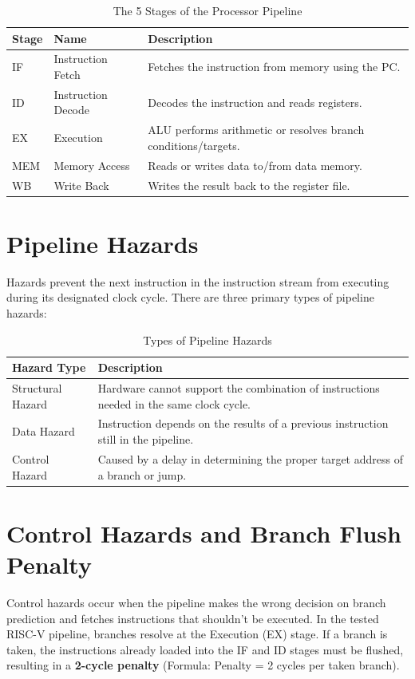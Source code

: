 \begin{table}[h]
\caption{The 5 Stages of the Processor Pipeline}
\centering
\begin{tabular}{|l|l|p{8cm}|}
\hline
\textbf{Stage} & \textbf{Name} & \textbf{Description} \\
\hline
IF & Instruction Fetch & Fetches the instruction from memory using the PC. \\
ID & Instruction Decode & Decodes the instruction and reads registers. \\
EX & Execution & ALU performs arithmetic or resolves branch conditions/targets. \\
MEM & Memory Access & Reads or writes data to/from data memory. \\
WB & Write Back & Writes the result back to the register file. \\
\hline
\end{tabular}
\label{tab:pipeline}
\end{table}

\section{Pipeline Hazards}
Hazards prevent the next instruction in the instruction stream from executing during its designated clock cycle. There are three primary types of pipeline hazards:

\begin{table}[h]
\caption{Types of Pipeline Hazards}
\centering
\begin{tabular}{|l|p{10cm}|}
\hline
\textbf{Hazard Type} & \textbf{Description} \\
\hline
Structural Hazard & Hardware cannot support the combination of instructions needed in the same clock cycle. \\
Data Hazard & Instruction depends on the results of a previous instruction still in the pipeline. \\
Control Hazard & Caused by a delay in determining the proper target address of a branch or jump. \\
\hline
\end{tabular}
\label{tab:hazards}
\end{table}

\section{Control Hazards and Branch Flush Penalty}
Control hazards occur when the pipeline makes the wrong decision on branch prediction and fetches instructions that shouldn't be executed. In the tested RISC-V pipeline, branches resolve at the Execution (EX) stage. If a branch is taken, the instructions already loaded into the IF and ID stages must be flushed, resulting in a \textbf{2-cycle penalty} (Formula: Penalty = 2 cycles per taken branch).

